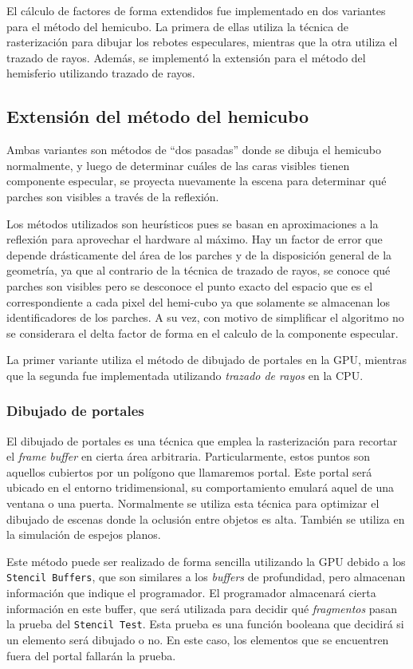 El cálculo de factores de forma extendidos fue implementado en dos variantes para el método del hemicubo. La primera de ellas utiliza la técnica de rasterización para dibujar los rebotes especulares, mientras que la otra utiliza el trazado de rayos. Además, se implementó la extensión para el método del hemisferio utilizando trazado de rayos.

\subsection{Extensión del método del hemicubo}
Ambas variantes son métodos de “dos pasadas” donde se dibuja el hemicubo normalmente, y luego de determinar cuáles de las caras visibles tienen componente especular, se proyecta nuevamente la escena para determinar qué parches son visibles a través de la reflexión.

Los métodos utilizados son heurísticos pues se basan en aproximaciones a la reflexión para aprovechar el hardware al máximo. Hay un factor de error que depende drásticamente del área de los parches y de la disposición general de la geometría, ya que al contrario de la técnica de trazado de rayos, se conoce qué parches son visibles pero se desconoce el punto exacto del espacio que es el correspondiente a cada pixel del hemi-cubo ya que solamente se almacenan los identificadores de los parches. A su vez, con motivo de simplificar el algoritmo no se considerara el delta factor de forma en el calculo de la componente especular.

La primer variante utiliza el método de dibujado de portales en la GPU, mientras que la segunda fue implementada utilizando \textit{trazado de rayos} en la CPU.

\subsubsection{Dibujado de portales}

El dibujado de portales es una técnica que emplea la rasterización para recortar el \textit{frame buffer} en cierta área arbitraria. Particularmente, estos puntos son aquellos cubiertos por un polígono que llamaremos portal. Este portal será ubicado en el entorno tridimensional, su comportamiento emulará aquel de una ventana o una puerta. Normalmente se utiliza esta técnica para optimizar el dibujado de escenas donde la oclusión entre objetos es alta. También se utiliza en la simulación de espejos planos.

Este método puede ser realizado de forma sencilla utilizando la GPU debido a los \verb|Stencil Buffers|, que son similares a los \textit{buffers} de profundidad, pero almacenan información que indique el programador. El programador almacenará cierta información en este buffer, que será utilizada para decidir qué \textit{fragmentos} pasan la prueba del \verb|Stencil Test|. Esta prueba es una función booleana que decidirá si un elemento será dibujado o no. En este caso, los elementos que se encuentren fuera del portal fallarán la prueba.

